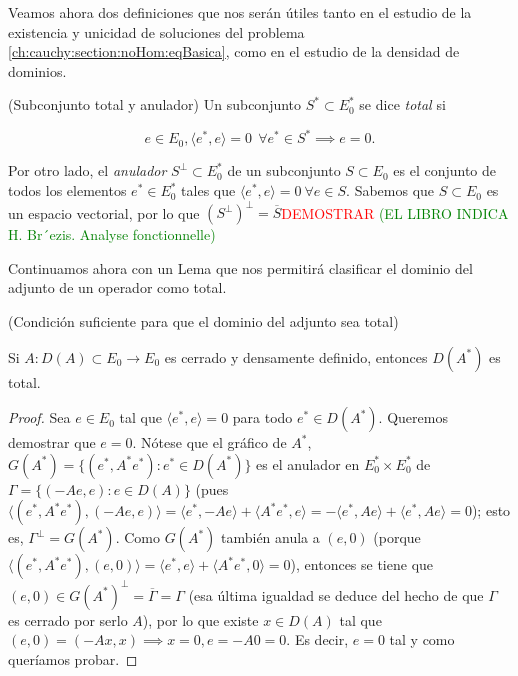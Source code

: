 Veamos ahora dos definiciones que nos serán útiles tanto en el estudio de la existencia y unicidad de soluciones del problema \eqref{ch:cauchy:section:noHom:eqBasica}, como en el estudio de la densidad de dominios.\\

\begin{Definicion}{(Subconjunto total y anulador)}
    \label{ch:cauchy:section:noHom:def:totalYAnulador}
    Un subconjunto $S^* \subset E^*_0$ se dice \textit{total} si

    \[e \in E_0, \langle e^*, e \rangle = 0 \ \  \forall e^* \in S^* \implies e = 0.\]

    Por otro lado, el \textit{anulador} $S^\perp \subset E^*_0$ de un subconjunto $S \subset E_0$ es el conjunto de todos los elementos $e^* \in E_0^*$ tales que $\langle e^*, e \rangle = 0 \ \forall e \in S$. Sabemos que $S \subset E_0$ es un espacio vectorial, por lo que $(S^\perp)^\perp = \overline{S}$\textcolor{red}{DEMOSTRAR} \textcolor{green}{(EL LIBRO INDICA H. Br´ezis. Analyse fonctionnelle)}
\end{Definicion}

Continuamos ahora con un Lema que nos permitirá clasificar el dominio del adjunto de un operador como total.\\

\begin{Lema}{(Condición suficiente para que el dominio del adjunto sea total)}
    \label{ch:cauchy:section:noHom:lema:dominioAdjTotal}

    Si $A : D(A) \subset E_0 \rightarrow E_0$ es cerrado y densamente definido, entonces $D(A^*)$ es total.
\end{Lema}

\begin{proof}
    Sea $e \in E_0$ tal que $\langle e^*, e \rangle = 0$ para todo $e^* \in D(A^*)$. Queremos demostrar que $e = 0$. Nótese que el gráfico de $A^*$, $G(A^*) = \{(e^*, A^*e^*) : e^* \in D(A^*)\}$ es el anulador en $E_0^* \times E_0^*$ de $\Gamma = \{(-Ae, e) : e \in D(A) \}$ (pues $\langle (e^*, A^*e^*), (-Ae, e)\rangle = \langle e^*, -Ae\rangle + \langle A^*e^*, e\rangle = -\langle e^*, Ae\rangle + \langle e^*, Ae\rangle = 0$); esto es, $\Gamma^\perp = G(A^*)$. Como $G(A^*)$ también anula a $(e,0)$ (porque $\langle (e^*, A^*e^*), (e,0)\rangle = \langle e^*, e\rangle + \langle A^*e^*, 0 \rangle = 0$), entonces se tiene que $(e,0) \in G(A^*)^\perp = \overline{\Gamma} = \Gamma$ (esa última igualdad se deduce del hecho de que $\Gamma$ es cerrado por serlo $A$), por lo que existe $x \in D(A)$ tal que $(e,0) = (-Ax, x) \implies x = 0, e = -A0 = 0$. Es decir, $e = 0$ tal y como queríamos probar.
\end{proof}

